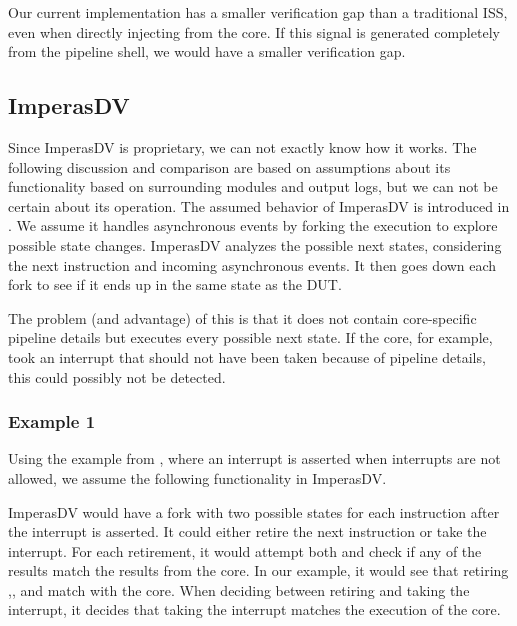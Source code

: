 Our current implementation has a smaller verification gap than a traditional ISS, even when directly injecting  from the core. If this signal is generated completely from the pipeline shell, we would have a smaller verification gap.


\subsection{ImperasDV}

Since ImperasDV is proprietary, we can not exactly know how it works. The following discussion and comparison are based on assumptions about its functionality based on surrounding modules and output logs, but we can not be certain about its operation. The assumed behavior of ImperasDV is introduced in . We assume it handles asynchronous events by forking the execution to explore possible state changes. 
ImperasDV analyzes the possible next states, considering the next instruction and incoming asynchronous events. It then goes down each fork to see if it ends up in the same state as the DUT.



The problem (and advantage) of this is that it does not contain core-specific pipeline details but executes every possible next state. If the core, for example, took an interrupt that should not have been taken because of pipeline details, this could possibly not be detected. 

\subsubsection{Example 1}


Using the example from , where an interrupt is asserted when interrupts are not allowed, we assume the following functionality in ImperasDV.

ImperasDV would have a fork with two possible states for each instruction after the interrupt is asserted. It could either retire the next instruction or take the interrupt. For each retirement, it would attempt both and check if any of the results match the results from the core. In our example, it would see that retiring ,, and  match with the core. When deciding between retiring  and taking the interrupt, it decides that taking the interrupt matches the execution of the core.


